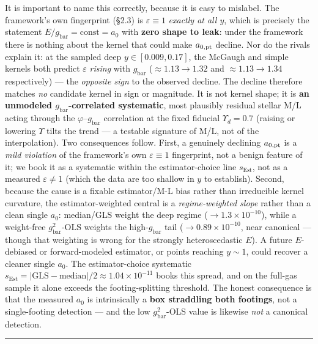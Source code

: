 \documentclass[
]{article}
\begin{document}
It is important to name this correctly, because it is easy to mislabel.
The framework's own fingerprint (§2.3) is \(\varepsilon\equiv1\)
\emph{exactly at all \(y\)}, which is precisely the statement
\(E/g_\mathrm{bar}=\mathrm{const}=a_0\) with \textbf{zero shape to leak}:
under the framework there is nothing about the kernel that could make
\(a_{0,\rm pt}\) decline. Nor do the rivals explain it: at the sampled
deep \(y\in[0.009,0.17]\), the McGaugh and simple kernels both predict
\(\varepsilon\) \emph{rising} with \(g_\mathrm{bar}\)
(\(\approx1.13\to1.32\) and \(\approx1.13\to1.34\) respectively) --- the
\emph{opposite sign} to the observed decline. The decline therefore
matches \emph{no} candidate kernel in sign or magnitude. It is not
kernel shape; it is \textbf{an unmodeled \(g_\mathrm{bar}\)-correlated
systematic}, most plausibly residual stellar M/L acting through the
\(\varphi\)--\(g_\mathrm{bar}\) correlation at the fixed fiducial
\(\Upsilon_d=0.7\) (raising or lowering \(\Upsilon\) tilts the trend ---
a testable signature of M/L, not of the interpolation). Two consequences
follow. First, a genuinely declining \(a_{0,\rm pt}\) is a \emph{mild
violation} of the framework's own \(\varepsilon\equiv1\) fingerprint,
not a benign feature of it; we book it as a systematic within the
estimator-choice line \(s_\mathrm{Est}\), not as a measured
\(\varepsilon\ne1\) (which the data are too shallow in \(y\) to
establish). Second, because the cause is a fixable estimator/M-L bias
rather than irreducible kernel curvature, the estimator-weighted central
is a \emph{regime-weighted slope} rather than a clean single \(a_0\):
median/GLS weight the deep regime (\(\to1.3\times10^{-10}\)), while a
weight-free \(g_\mathrm{bar}^2\)-OLS weights the high-\(g_\mathrm{bar}\) tail
(\(\to0.89\times10^{-10}\), near canonical --- though that weighting is
wrong for the strongly heteroscedastic \(E\)). A future \(E\)-debiased
or forward-modeled estimator, or points reaching \(y\sim1\), could
recover a cleaner single \(a_0\). The estimator-choice systematic
\(s_\mathrm{Est}=|\mathrm{GLS}-\mathrm{median}|/2\approx1.04\times10^{-11}\)
books this spread, and on the full-gas sample it alone exceeds the
footing-splitting threshold. The honest consequence is that the measured
\(a_0\) is intrinsically a \textbf{box straddling both footings}, not a
single-footing detection --- and the low \(g_\mathrm{bar}^2\)-OLS value is
likewise \emph{not} a canonical detection.

\begin{center}\rule{0.5\linewidth}{0.5pt}\end{center}
\end{document}
